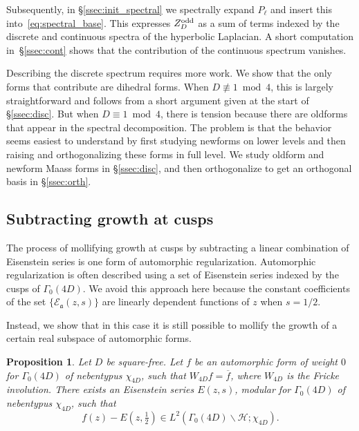 \documentclass[11pt,reqno,oneside]{amsart}
\theoremstyle{plain}
\newtheorem{proposition}[theorem]{Proposition}
\theoremstyle{definition}
\newcommand{\calH}{\mathcal{H}}
\newcommand{\Zodd}{Z_D^{\textup{odd}}}
\newcommand{\chid}{\chi_{4D}}
\begin{document}
Subsequently, in \S\ref{ssec:init_spectral} we spectrally expand $P_\ell$ and
insert this into~\eqref{eq:spectral_base}.
This expresses $\Zodd$ as a sum of terms indexed by the discrete and continuous
spectra of the hyperbolic Laplacian.
A short computation in~\S\ref{ssec:cont} shows that the contribution of the continuous spectrum vanishes.

Describing the discrete spectrum requires more work.
We show that the only forms that contribute are dihedral forms.
When $D \not \equiv 1 \bmod 4$, this is largely straightforward and follows
from a short argument given at the start of \S\ref{ssec:disc}.
But when $D \equiv 1 \bmod 4$, there is tension because there are oldforms that
appear in the spectral decomposition.
The problem is that the behavior seems easiest to understand by first studying
newforms on lower levels and then raising and orthogonalizing these forms in
full level.
We study oldform and newform Maass forms in \S\ref{ssec:disc}, and then
orthogonalize to get an orthogonal basis in \S\ref{ssec:orth}.


\subsection{Subtracting growth at cusps}\label{ssec:subt}

The process of mollifying growth at cusps by subtracting a linear combination
of Eisenstein series is one form of automorphic regularization.
Automorphic regularization is often described using a set of Eisenstein series
indexed by the cusps of $\Gamma_0(4D)$.
We avoid this approach here because the constant coefficients of the set
$\{\mathcal{E}_\mathfrak{a}(z,s)\}$ are linearly dependent functions of $z$
when $s = 1/2$.

Instead, we show that in this case it is still possible to mollify the growth of a certain real subspace of automorphic forms.

\begin{proposition}\label{prop:Fricke-regularizable}
  Let $D$ be square-free. Let $f$ be an automorphic form of weight $0$ for $\Gamma_0(4D)$ of nebentypus $\chid$, such that $W_{4D} f = \overline{f}$, where $W_{4D}$ is the Fricke involution.
  There exists an Eisenstein series $E(z,s)$, modular for $\Gamma_0(4D)$ of nebentypus $\chid$, such that
  \begin{equation}
    f(z) - E(z, \tfrac{1}{2})
    \in L^2(\Gamma_0(4D) \backslash \calH; \chid).
  \end{equation}
\end{proposition}
\end{document}
